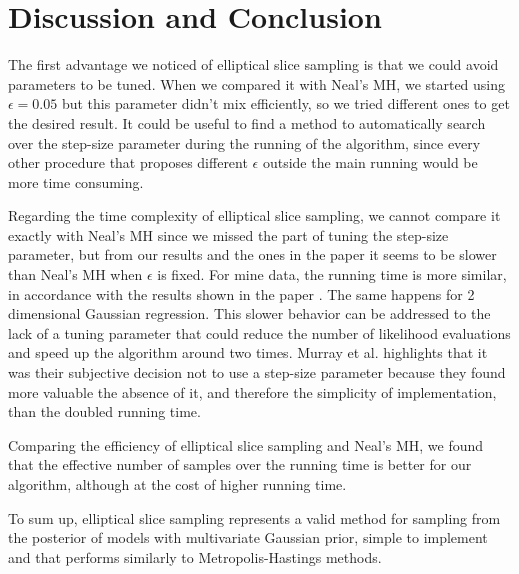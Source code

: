 \documentclass{article}
\begin{document}
\section{Discussion and Conclusion}

The first advantage we noticed of elliptical slice sampling is that we could avoid parameters to be tuned. When we compared it with Neal's MH, we started using $\epsilon=0.05$ but this parameter didn't mix efficiently, so we tried different ones to get the desired result. It could be useful to find a method to automatically search over the step-size parameter during the running of the algorithm, since every other procedure that proposes different $\epsilon$ outside the main running would be more time consuming.

Regarding the time complexity of elliptical slice sampling, we cannot compare it exactly with Neal's MH since we missed the part of tuning the step-size parameter, but from our results and the ones in the paper \cite{MAM} it seems to be slower than Neal's MH when $\epsilon$ is fixed. For mine data, the running time is more similar, in accordance with the results shown in the paper \cite{MAM}. The same happens for 2 dimensional Gaussian regression.
This slower behavior can be addressed to the lack of a tuning parameter that could reduce the number of likelihood evaluations and speed up the algorithm around two times. Murray et al. highlights that it was their subjective decision not to use a step-size parameter because they found more valuable the absence of it, and therefore the simplicity of implementation, than the doubled running time.

Comparing the efficiency of elliptical slice sampling and Neal's MH, we found that the effective number of samples over the running time is better for our algorithm, although at the cost of higher running time.

To sum up, elliptical slice sampling represents a valid method for sampling from the posterior of models with multivariate Gaussian prior, simple to implement and that performs similarly to Metropolis-Hastings methods.
\end{document}
